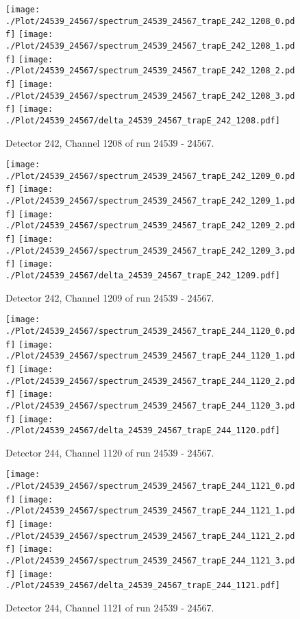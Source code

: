\clearpage
\begin{figure}[hb]
\centering
\texttt{[image: ./Plot/24539\_24567/spectrum\_24539\_24567\_trapE\_242\_1208\_0.pdf]}
\texttt{[image: ./Plot/24539\_24567/spectrum\_24539\_24567\_trapE\_242\_1208\_1.pdf]}
\texttt{[image: ./Plot/24539\_24567/spectrum\_24539\_24567\_trapE\_242\_1208\_2.pdf]}
\texttt{[image: ./Plot/24539\_24567/spectrum\_24539\_24567\_trapE\_242\_1208\_3.pdf]}
\texttt{[image: ./Plot/24539\_24567/delta\_24539\_24567\_trapE\_242\_1208.pdf]}
\caption{ Detector 242, Channel 1208 of run 24539 - 24567.}
\label{fig:24539_24567_trapE_242_1208}
\end{figure}
\clearpage
\begin{figure}[hb]
\centering
\texttt{[image: ./Plot/24539\_24567/spectrum\_24539\_24567\_trapE\_242\_1209\_0.pdf]}
\texttt{[image: ./Plot/24539\_24567/spectrum\_24539\_24567\_trapE\_242\_1209\_1.pdf]}
\texttt{[image: ./Plot/24539\_24567/spectrum\_24539\_24567\_trapE\_242\_1209\_2.pdf]}
\texttt{[image: ./Plot/24539\_24567/spectrum\_24539\_24567\_trapE\_242\_1209\_3.pdf]}
\texttt{[image: ./Plot/24539\_24567/delta\_24539\_24567\_trapE\_242\_1209.pdf]}
\caption{ Detector 242, Channel 1209 of run 24539 - 24567.}
\label{fig:24539_24567_trapE_242_1209}
\end{figure}
\clearpage
\begin{figure}[hb]
\centering
\texttt{[image: ./Plot/24539\_24567/spectrum\_24539\_24567\_trapE\_244\_1120\_0.pdf]}
\texttt{[image: ./Plot/24539\_24567/spectrum\_24539\_24567\_trapE\_244\_1120\_1.pdf]}
\texttt{[image: ./Plot/24539\_24567/spectrum\_24539\_24567\_trapE\_244\_1120\_2.pdf]}
\texttt{[image: ./Plot/24539\_24567/spectrum\_24539\_24567\_trapE\_244\_1120\_3.pdf]}
\texttt{[image: ./Plot/24539\_24567/delta\_24539\_24567\_trapE\_244\_1120.pdf]}
\caption{ Detector 244, Channel 1120 of run 24539 - 24567.}
\label{fig:24539_24567_trapE_244_1120}
\end{figure}
\clearpage
\begin{figure}[hb]
\centering
\texttt{[image: ./Plot/24539\_24567/spectrum\_24539\_24567\_trapE\_244\_1121\_0.pdf]}
\texttt{[image: ./Plot/24539\_24567/spectrum\_24539\_24567\_trapE\_244\_1121\_1.pdf]}
\texttt{[image: ./Plot/24539\_24567/spectrum\_24539\_24567\_trapE\_244\_1121\_2.pdf]}
\texttt{[image: ./Plot/24539\_24567/spectrum\_24539\_24567\_trapE\_244\_1121\_3.pdf]}
\texttt{[image: ./Plot/24539\_24567/delta\_24539\_24567\_trapE\_244\_1121.pdf]}
\caption{ Detector 244, Channel 1121 of run 24539 - 24567.}
\label{fig:24539_24567_trapE_244_1121}
\end{figure}
